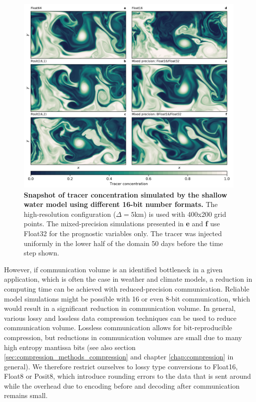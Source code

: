 \begin{figure}[htbp]
\includegraphics[width=1\textwidth]{Figures/swm/snapshot.png}
\caption{\textbf{Snapshot of tracer concentration simulated by the shallow water model using different 16-bit number formats.}
The high-resolution configuration ($\Delta = 5$km) is used with 400x200 grid points. The mixed-precision simulations presented
in \textbf{e} and \textbf{f} use Float32 for the prognostic variables only. The tracer was injected uniformly in the lower half of the
domain 50 days before the time step shown.}
\label{fig:snapshot}
\end{figure}

However, if communication volume is an identified bottleneck in a given application, which is often the case in weather and
climate models, a reduction in computing time can be achieved with reduced-precision communication. Reliable model simulations
might be possible with 16 or even 8-bit communication, which would result in a significant reduction in communication volume.
In general, various lossy and lossless data compression techniques can be used to reduce communication volume. Lossless
communication allows for bit-reproducible compression, but reductions in communication volumes are small due to many
high entropy mantissa bits (see also section \ref{sec:compression_methods_compression} and chapter
\ref{chap:compression} in general). We therefore restrict ourselves to lossy type conversions to Float16, Float8 or Posit8,
which introduce rounding errors to the data that is sent around while the overhead due to encoding before and decoding
after communication remains small.

